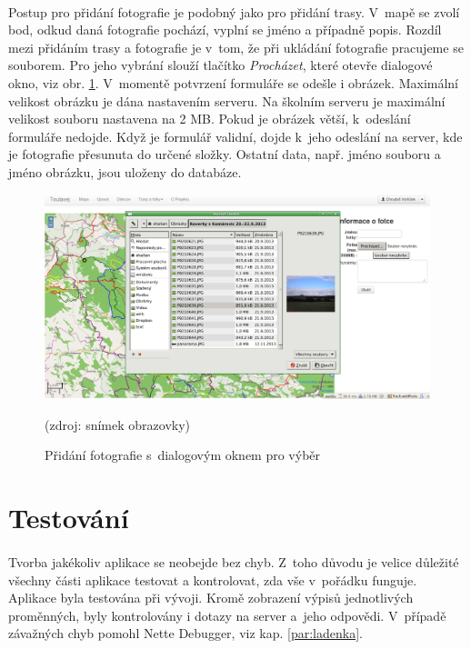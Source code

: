 \documentclass[11pt,a4paper,titlepage,oneside]{book}
\begin{document}
		
			\paragraph{}Postup pro přidání fotografie je podobný jako pro přidání trasy. V~mapě se zvolí bod, odkud daná fotografie pochází, vyplní se jméno a případně popis. Rozdíl mezi přidáním trasy a fotografie je v~tom, že při ukládání fotografie pracujeme se souborem. Pro jeho vybrání slouží tlačítko \textit{Procházet}, které otevře dialogové okno, viz obr. \ref{fig:addImage}. V~momentě potvrzení formuláře se odešle i obrázek. Maximální velikost obrázku je dána nastavením serveru. Na školním serveru je maximální velikost souboru nastavena na 2 MB. Pokud je obrázek větší, k~odeslání formuláře nedojde. Když je formulář validní, dojde k~jeho odeslání na server, kde je fotografie přesunuta do určené složky. Ostatní data, např. jméno souboru a jméno obrázku, jsou uloženy do databáze.
		\begin{figure}[!h]
			\begin{center}
				\includegraphics[width=12cm]{obrazky/toulavej/addImage.png}
				\caption{Přidání fotografie s~dialogovým oknem pro výběr}
				\label{fig:addImage}
				(zdroj: snímek obrazovky)
			\end{center}
		\end{figure}


		\section{Testování}
                

		\paragraph{} Tvorba jakékoliv aplikace se neobejde bez chyb. Z~toho důvodu je velice důležité všechny části aplikace testovat a kontrolovat, zda vše v~pořádku funguje. Aplikace  byla testována při vývoji. Kromě zobrazení výpisů jednotlivých proměnných, byly kontrolovány i dotazy na server a~jeho odpovědi. V~případě závažných chyb pomohl Nette Debugger, viz kap. \ref{par:ladenka}.
\end{document}
